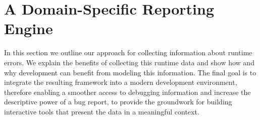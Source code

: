 %
%
%
%


\section{A Domain-Specific Reporting Engine} \label{sec:reified-framework}

In this section we outline our approach for collecting information about runtime errors.
We explain the benefits of collecting this runtime data and show how and why development can benefit from modeling this information.
The final goal is to integrate the resulting framework into a modern development environment, therefore enabling a smoother access to debugging information and increase the descriptive power of a bug report, to provide the groundwork for building interactive tools that present the data in a meaningful context.

